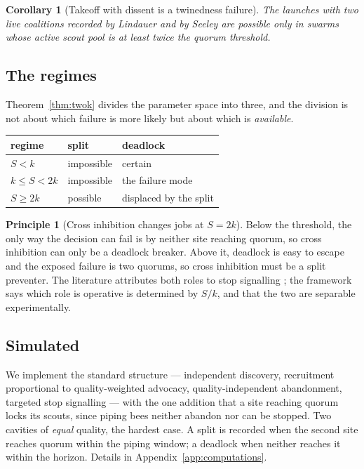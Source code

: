 \documentclass[11pt,a4paper]{article}
\theoremstyle{plain}
\newtheorem{corollary}[theorem]{Corollary}
\theoremstyle{definition}
\newtheorem{principle}[theorem]{Principle}
\theoremstyle{remark}
\begin{document}
\begin{corollary}[Takeoff with dissent is a twinedness failure]\label{cor:dissent}
The launches with two live coalitions recorded by Lindauer and by Seeley
\cite{Seeley10} are possible only in swarms whose active scout pool is at least
twice the quorum threshold.
\end{corollary}

\subsection{The regimes}

Theorem~\ref{thm:twok} divides the parameter space into three, and the division
is not about which failure is more likely but about which is \emph{available}.

\begin{center}
\begin{tabular}{@{}lll@{}}
\toprule
regime & split & deadlock\\
\midrule
$S < k$ & impossible & certain\\
$k \le S < 2k$ & impossible & the failure mode\\
$S \ge 2k$ & possible & displaced by the split\\
\bottomrule
\end{tabular}
\end{center}

\begin{principle}[Cross inhibition changes jobs at $S = 2k$]\label{prin:jobs}
Below the threshold, the only way the decision can fail is by neither site
reaching quorum, so cross inhibition can only be a deadlock breaker. Above it,
deadlock is easy to escape and the exposed failure is two quorums, so cross
inhibition must be a split preventer. The literature attributes both roles to
stop signalling \cite{Seeley12}; the framework says which role is operative is
determined by $S/k$, and that the two are separable experimentally.
\end{principle}

\subsection{Simulated}

We implement the standard structure --- independent discovery, recruitment
proportional to quality-weighted advocacy, quality-independent abandonment,
targeted stop signalling --- with the one addition that a site reaching quorum
locks its scouts, since piping bees neither abandon nor can be stopped. Two
cavities of \emph{equal} quality, the hardest case. A split is recorded when the
second site reaches quorum within the piping window; a deadlock when neither
reaches it within the horizon. Details in Appendix~\ref{app:computations}.
\end{document}
